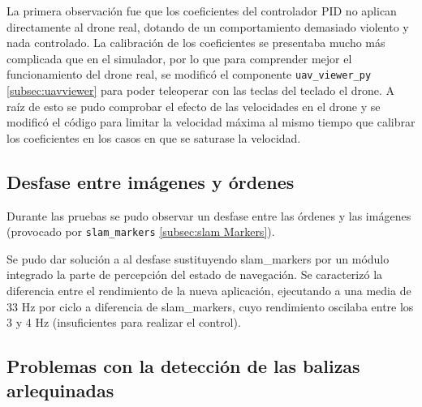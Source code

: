 La primera observación fue que los coeficientes del controlador PID no aplican directamente al drone real, dotando de un comportamiento demasiado violento y nada controlado. La calibración de los coeficientes se presentaba mucho más complicada que en el simulador, por lo que para comprender mejor el funcionamiento del drone real, se modificó el componente \texttt{uav\_viewer\_py} \ref{subsec:uavviewer} para poder teleoperar con las teclas del teclado el drone. A raíz de esto se pudo comprobar el efecto de las velocidades en el drone y se modificó el código para limitar la velocidad máxima al mismo tiempo que calibrar los coeficientes en los casos en que se saturase la velocidad.

\subsection{Desfase entre imágenes y órdenes}

Durante las pruebas se pudo observar un desfase entre las órdenes y las imágenes (provocado por \texttt{slam\_markers} \ref{subsec:slam Markers}). 

Se pudo dar solución a al desfase sustituyendo slam\_markers por un módulo integrado la parte de percepción del estado de navegación. Se caracterizó la diferencia entre el rendimiento de la nueva aplicación, ejecutando a una media de 33 Hz por ciclo a diferencia de slam\_markers, cuyo rendimiento oscilaba entre los 3 y 4 Hz (insuficientes para realizar el control). 

\subsection{Problemas con la detección de las balizas arlequinadas}

